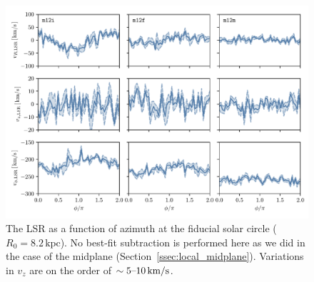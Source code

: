 \documentclass[twocolumn]{aastex62}
\newcommand{\kpc}{\text{kpc}}
\newcommand{\kms}{\text{km}/\text{s}}
\begin{document}
\begin{figure}[htb!]
\begin{center}
\includegraphics[width=\textwidth]{fig/lsr.pdf}
\end{center}
\caption{The LSR as a function of azimuth at the
fiducial solar circle ($R_0 = 8.2\,\kpc$). No best-fit subtraction is
performed here as we did in the case of the midplane
(Section~\ref{ssec:local_midplane}). Variations in $v_z$ are on the order of
$\sim5\textup{--}10\,\kms$.}
\label{fig:lsr_variations}
\end{figure}


\end{document}
